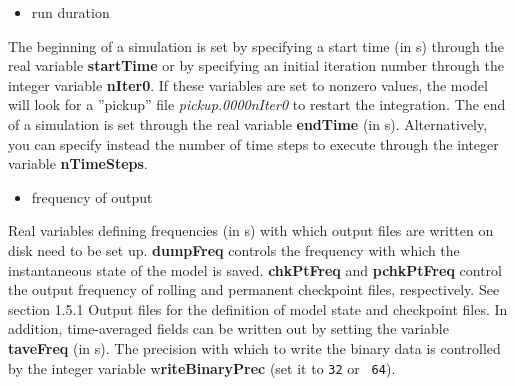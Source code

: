 \begin{itemize}
\item run duration
\end{itemize}

The beginning of a simulation is set by specifying a start time (in s)
through the real variable \textbf{startTime }or by specifying an initial
iteration number through the integer variable \textbf{nIter0}. If these
variables are set to nonzero values, the model will look for a ''pickup''
file \textit{pickup.0000nIter0 }to restart the integration\textit{. }The end
of a simulation is set through the real variable \textbf{endTime }(in s).
Alternatively, you can specify instead the number of time steps to execute
through the integer variable \textbf{nTimeSteps}. 

\begin{itemize}
\item frequency of output
\end{itemize}

Real variables defining frequencies (in s) with which output files are
written on disk need to be set up. \textbf{dumpFreq }controls the frequency
with which the instantaneous state of the model is saved. \textbf{chkPtFreq }%
and \textbf{pchkPtFreq }control the output frequency of rolling and
permanent checkpoint files, respectively. See section 1.5.1 Output files for the
definition of model state and checkpoint files. In addition, time-averaged
fields can be written out by setting the variable \textbf{taveFreq} (in s).
The precision with which to write the binary data is controlled by the
integer variable w\textbf{riteBinaryPrec }(set it to \texttt{32} or \texttt{%
64}).

